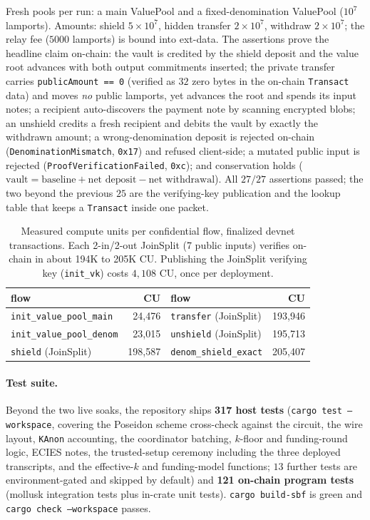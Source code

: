 \documentclass[10pt]{article}
\newcommand{\code}[1]{\texttt{#1}}
\begin{document}
Fresh pools per run: a main ValuePool and a fixed-denomination ValuePool
($10^7$ lamports). Amounts: shield $5\times10^7$, hidden transfer $2\times10^7$,
withdraw $2\times10^7$; the relay fee ($5000$ lamports) is bound into ext-data.
The assertions prove the headline claim on-chain: the vault is credited by the
shield deposit and the value root advances with both output commitments inserted;
the private transfer carries \code{publicAmount == 0} (verified as $32$ zero bytes
in the on-chain \code{Transact} data) and moves \emph{no} public lamports, yet
advances the root and spends its input notes; a recipient auto-discovers the
payment note by scanning encrypted blobs; an unshield credits a fresh recipient
and debits the vault by exactly the withdrawn amount; a wrong-denomination deposit
is rejected on-chain (\code{DenominationMismatch}, \code{0x17}) and refused
client-side; a mutated public input is rejected (\code{ProofVerificationFailed},
\code{0xc}); and conservation holds ($\text{vault} = \text{baseline} +
\text{net deposit} - \text{net withdrawal}$). All $27/27$ assertions passed; the
two beyond the previous $25$ are the verifying-key publication and the lookup
table that keeps a \code{Transact} inside one packet.

\begin{table}[h]
\centering
\small
\begin{tabular}{@{}lr@{\hskip 2.2em}lr@{}}
\toprule
\textbf{flow} & \textbf{CU} & \textbf{flow} & \textbf{CU} \\
\midrule
\code{init\_value\_pool\_main}  & 24{,}476 & \code{transfer} (JoinSplit) & 193{,}946 \\
\code{init\_value\_pool\_denom} & 23{,}015 & \code{unshield} (JoinSplit) & 195{,}713 \\
\code{shield} (JoinSplit)       & 198{,}587 & \code{denom\_shield\_exact}  & 205{,}407 \\
\bottomrule
\end{tabular}
\caption{Measured compute units per confidential flow, finalized devnet
transactions. Each 2-in/2-out JoinSplit (7 public inputs) verifies on-chain in
about 194K to 205K CU. Publishing the JoinSplit verifying key (\code{init\_vk})
costs $4{,}108$ CU, once per deployment.}
\end{table}

\paragraph{Test suite.} Beyond the two live soaks, the repository ships
\textbf{317 host tests} (\code{cargo test --workspace}, covering the Poseidon
scheme cross-check against the circuit, the wire layout, \code{KAnon} accounting,
the coordinator batching, $k$-floor and funding-round logic, ECIES notes, the
trusted-setup ceremony including the three deployed transcripts, and the
effective-$k$ and funding-model functions; $13$ further tests are
environment-gated and skipped by default) and \textbf{121 on-chain program tests} (mollusk integration tests plus in-crate unit tests).
\code{cargo build-sbf} is green and \code{cargo check --workspace} passes.
\end{document}
